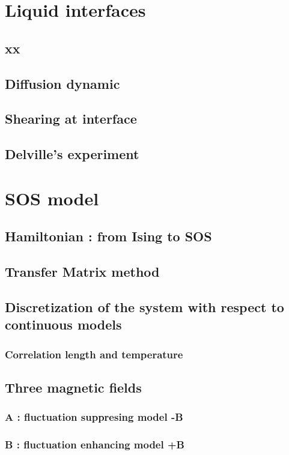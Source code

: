 \documentclass[a4paper,11pt]{report}
\begin{document}
\tableofcontents

\chapter{Liquid interfaces}
  \section{xx}
  \section{Diffusion dynamic}
  \section{Shearing at interface}
  \section{Delville's experiment}

\chapter{SOS model}
  \section{Hamiltonian : from Ising to SOS }
  \section{Transfer Matrix method}
  \section{Discretization of the system with respect to continuous models}
    \subsection{Correlation length and temperature}
  \section{Three magnetic fields}
    \subsection{A : fluctuation suppresing model -B }
    \subsection{B : fluctuation enhancing model +B}
\end{document}
